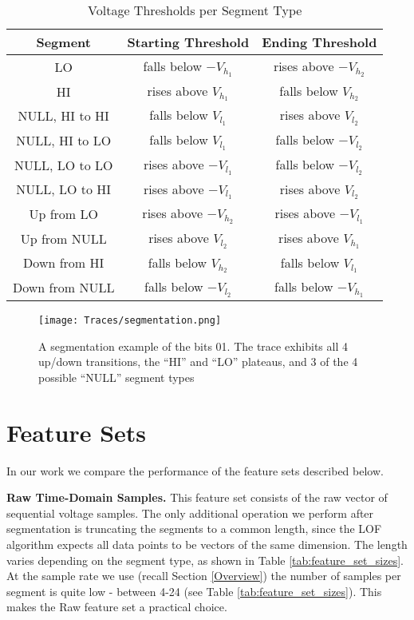 \documentclass[compsoc,conference,a4paper,10pt,times]{IEEEtran}
\newcommand{\level}[1]{\section{#1}}
\newcommand{\level}[1]{\chapter{#1}}
\begin{document}
  \begin{table}
    \caption{Voltage Thresholds per Segment Type}
    \label{tab:SegmentationLevels}
    \centering
    \begin{tabular}{|c c c|} 
      \hline
      Segment & Starting Threshold & Ending Threshold \\ [0.5ex] 
      \hline\hline
      LO & falls below $-V_{h_1}$ & rises above $-V_{h_2}$ \\
      \hline
      HI & rises above $V_{h_1}$ & falls below $V_{h_2}$ \\
      \hline
      NULL, HI to HI & falls below $V_{l_1}$ & rises above $V_{l_2}$ \\
      \hline
      NULL, HI to LO & falls below $V_{l_1}$ & falls below $-V_{l_2}$ \\
      \hline
      NULL, LO to LO & rises above $-V_{l_1}$ & falls below $-V_{l_2}$ \\
      \hline
      NULL, LO to HI & rises above $-V_{l_1}$ & rises above $V_{l_2}$ \\
      \hline
      Up from LO & rises above $-V_{h_2}$ & rises above $-V_{l_1}$ \\
      \hline
      Up from NULL & rises above $V_{l_2}$ & rises above $V_{h_1}$ \\
      \hline
      Down from HI & falls below $V_{h_2}$ & falls below $V_{l_1}$ \\
      \hline
      Down from NULL & falls below $-V_{l_2}$ & falls below $-V_{h_1}$ \\
      \hline
    \end{tabular}
  \end{table}
  
  \begin{figure}[t]
    \centering
    \texttt{[image: Traces/segmentation.png]}
    \caption{A segmentation example of the bits 01. The trace exhibits all 4 up/down transitions, the ``HI'' and ``LO'' plateaus, and 3 of the 4 possible ``NULL'' segment types}
    \label{fig:SegmentationTrace}
  \end{figure}
  
\level{Feature Sets} \label{FeatureSets}
  In our work we compare the performance of the feature sets described below.
 
{\bf Raw Time-Domain Samples.}
  This feature set consists of the raw vector of sequential voltage samples. The only additional operation we perform after segmentation is truncating the segments to a common length, since the LOF algorithm expects all data points to be vectors of the same dimension. The length varies depending on the segment type, as shown in Table \ref{tab:feature_set_sizes}. At the sample rate we use (recall Section \ref{Overview}) the number of samples per segment is quite low - between 4-24 (see Table \ref{tab:feature_set_sizes}). This makes the Raw feature set a practical choice.
  
\end{document}

